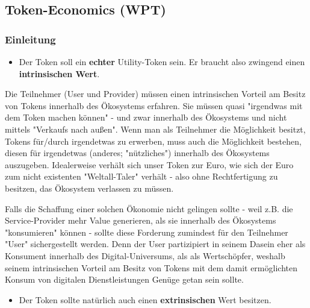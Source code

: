 
\subsection{Token-Economics (WPT)}
\label{sec:eco_wpt}


\subsubsection{Einleitung}
\label{sec:wpt_einleitung}

\begin{Praemisse}

\begin{itemize}
  \item Der Token soll ein \textbf{echter} Utility-Token sein. Er braucht also zwingend einen \textbf{intrinsischen Wert}.
\end{itemize}

\vspace{0.2cm}

Die Teilnehmer (User und Provider) müssen einen intrinsischen Vorteil am Besitz von Tokens innerhalb des Ökosystems erfahren. Sie müssen quasi "irgendwas mit dem Token machen können" - und zwar innerhalb des Ökosystems und nicht mittels "Verkaufs nach außen". Wenn man als Teilnehmer die Möglichkeit besitzt, Tokens für/durch irgendetwas zu erwerben, muss auch die Möglichkeit bestehen, diesen für irgendetwas (anderes; "nützliches") innerhalb des Ökosystems auszugeben. Idealerweise verhält sich unser Token zur Euro, wie sich der Euro zum nicht existenten "Weltall-Taler" verhält - also ohne Rechtfertigung zu besitzen, das Ökosystem verlassen zu müssen.

Falls die Schaffung einer solchen Ökonomie nicht gelingen sollte - weil z.B. die Service-Provider mehr Value generieren, als sie innerhalb des Ökosystems "konsumieren" können -  sollte diese Forderung zumindest für den Teilnehmer "User" sichergestellt werden. Denn der User partizipiert in seinem Dasein eher als Konsument innerhalb des Digital-Universums, als als Wertschöpfer, weshalb seinem intrinsischen Vorteil am Besitz von Tokens mit dem damit ermöglichten Konsum von digitalen Dienstleistungen Genüge getan sein sollte.

\vspace{0.3cm}

\begin{itemize}
  \item Der Token sollte natürlich auch einen \textbf{extrinsischen} Wert besitzen.
\end{itemize}


\end{Praemisse}
